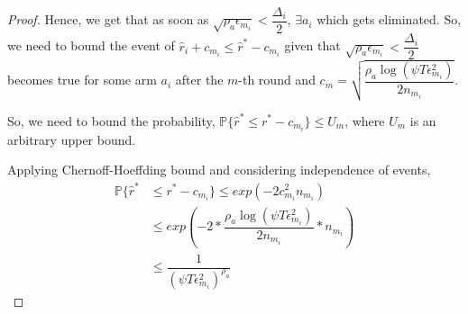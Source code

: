 \begin{proof}
  Hence, we get that as soon as $\sqrt{\rho_{a}\epsilon_{m_{i}}}<\dfrac{\Delta_{i}}{2}$, $\exists a_{i}$ which gets eliminated.
  So, we need to bound the event of $\hat{r}_{i}+c_{m_{i}}\leq \hat{r}^{*}-c_{m_{i}}$ given that $\sqrt{\rho_{a}\epsilon_{m_{i}}}<\dfrac{\Delta_{i}}{2}$ becomes true for some arm $a_{i}$ after the $m$-th round and $c_{m}=\sqrt{\dfrac{\rho_{a}\log (\psi T\epsilon_{m_{i}}^{2})}{2 n_{m_{i}}}}$.

% 
	So, we need to bound the probability,
 \hspace*{4em} $\mathbb{P}\lbrace\hat{r}^{*}\leq r^{*} - c_{m_{i}}\rbrace\leq U_{m}$, where $U_{m}$ is an  arbitrary upper bound.
 
% 
Applying Chernoff-Hoeffding bound and considering independence of events,
  \begin{align*}
\mathbb{P}\lbrace\hat{r}^{*}&\leq r^{*} - c_{m_{i}}\rbrace\leq exp(-2c_{m_{i}}^{2}n_{m_{i}})\\
&\leq exp(-2 * \dfrac{\rho_{a}\log (\psi T\epsilon_{m_{i}}^{2})}{2 n_{m_{i}}} *n_{m_{i}})\\
&\leq \dfrac{1}{(\psi T\epsilon_{m_{i}}^{2})^{\rho_{a}}}   
  \end{align*}
 

\end{proof}
